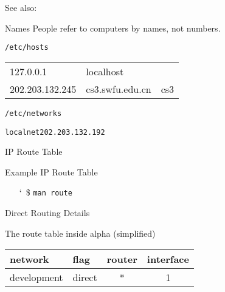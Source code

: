 See also: 

\begin{frame}{Names}
  People refer to computers by names, not numbers.
  \begin{iblock}{\texttt{/etc/hosts}}
    \begin{center}{\ttfamily
      \begin{tabular}{lll}
        127.0.0.1 & localhost&\\
        202.203.132.245 & cs3.swfu.edu.cn & cs3\\
      \end{tabular}}
    \end{center}
  \end{iblock}

  \begin{iblock}{\texttt{/etc/networks}}
    \begin{center}
      \texttt{localnet}\qquad \texttt{202.203.132.192}
    \end{center}
  \end{iblock}
\end{frame}

\begin{frame}{IP Route Table}
  \begin{iblock}{Example IP Route Table}
    \begin{center}
    \end{center}
  \end{iblock}
  \begin{itemize}
  \item[\char`~\$] \texttt{man route}
  \end{itemize}
\end{frame}

\begin{frame}{Direct Routing Details}
  \begin{minipage}{.4\linewidth}
  \end{minipage}\quad
  \begin{minipage}{.55\linewidth}
    \begin{iblock}{The route table inside alpha (simplified)}
      \begin{center}\ttfamily
        \begin{tabular}{llcc}
          \toprule
          network & flag & router & interface\\\midrule
          development & direct & * & 1\\\bottomrule
        \end{tabular}
      \end{center}
    \end{iblock}
  \end{minipage}
\end{frame}

